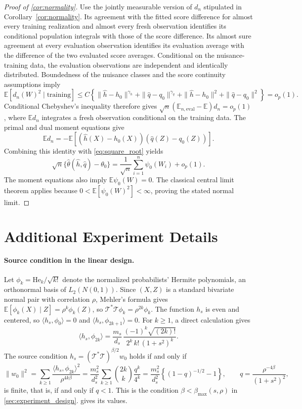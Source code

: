 \begin{proof}[Proof of \cref{cor:normality}]
Use the jointly measurable version of $d_n$ stipulated in Corollary~\ref{cor:normality}. Its agreement with the fitted score difference for almost every training realization and almost every fresh observation identifies its conditional population integrals with those of the score difference. Its almost sure agreement at every evaluation observation identifies its evaluation average with the difference of the two evaluated score averages.
Conditional on the nuisance-training data, the evaluation observations
are independent and identically distributed. Boundedness of the nuisance
classes and the score continuity assumptions imply
\[
\mathbb E[d_n(W)^2\mid\text{training}]
\leqslant C\left\{
\|\hat h-h_0\|^{\gamma_h}+\|\hat q-q_0\|^{\gamma_q}
+\|\hat h-h_0\|^2+\|\hat q-q_0\|^2
\right\}=o_p(1).
\]
Conditional Chebyshev's inequality therefore gives
$\sqrt n(\mathbb E_{n,\mathrm{eval}}-\mathbb E)d_n=o_p(1)$,
where $\mathbb E d_n$ integrates a fresh observation conditional on
the training data. The primal and dual moment equations give
\[
\mathbb E d_n
=-\mathbb E[(\hat h(X)-h_0(X))(\hat q(Z)-q_0(Z))].
\]
Combining this identity with \eqref{eq:square_root} yields
\[
\sqrt n\{\hat\theta(\hat h,\hat q)-\theta_0\}
=\frac1{\sqrt n}\sum_{i=1}^n\psi_0(W_i)+o_p(1).
\]
The moment equations also imply $\mathbb E\psi_0(W)=0$. The
classical central limit theorem applies because
$0<\mathbb E[\psi_0(W)^2]<\infty$, proving the stated normal limit.
\end{proof}


\section{Additional Experiment Details}\label{sec:experiment_details}

\paragraph{Source condition in the linear design.}
Let $\phi_k=\mathrm{He}_k/\sqrt{k!}$ denote the normalized probabilists' Hermite polynomials, an orthonormal basis of $L_2(N(0,1))$. Since $(X,Z)$ is a standard bivariate normal pair with correlation $\rho$, Mehler's formula gives $\mathbb E[\phi_k(X)\mid Z]=\rho^k\phi_k(Z)$, so $\mathcal T^*\mathcal T\phi_k=\rho^{2k}\phi_k$. The function $h_s$ is even and centered, so $\langle h_s,\phi_0\rangle=0$ and $\langle h_s,\phi_{2k+1}\rangle=0$. For $k\geqslant1$, a direct calculation gives
\[
\langle h_s,\phi_{2k}\rangle=\frac{m_s}{d_s}\,\frac{(-1)^k\sqrt{(2k)!}}{2^k\,k!\,(1+s^2)^k}.
\]
The source condition $h_s=(\mathcal T^*\mathcal T)^{\beta/2}w_0$ holds if and only if
\[
\|w_0\|^2=\sum_{k\geqslant1}\frac{\langle h_s,\phi_{2k}\rangle^2}{\rho^{4k\beta}}
=\frac{m_s^2}{d_s^2}\sum_{k\geqslant1}\binom{2k}{k}\frac{q^k}{4^k}
=\frac{m_s^2}{d_s^2}\left\{(1-q)^{-1/2}-1\right\},
\qquad
q=\frac{\rho^{-4\beta}}{(1+s^2)^2},
\]
is finite, that is, if and only if $q<1$. This is the condition $\beta<\beta_{\max}(s,\rho)$ in \cref{sec:experiment_design}.  gives its values.

